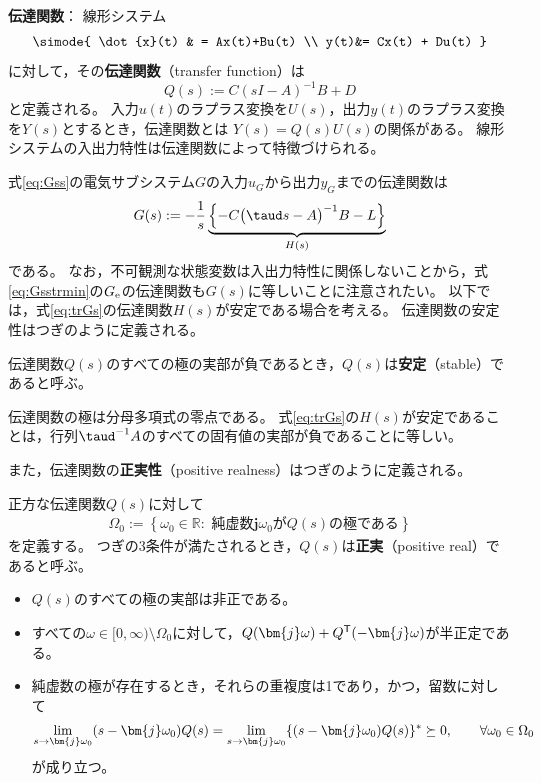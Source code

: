 \documentclass[tombow,dvipdfmx]{corona-a5-1.1}
\begin{document}
\begin{COLUMN}
\noindent \textbf{伝達関数}：
線形システム
\begin{align*}
\simode{
\dot{x}(t) & = Ax(t)+Bu(t) \\
y(t)&= Cx(t) + Du(t)
}
\end{align*}
に対して，その\textbf{伝達関数}（transfer function）は
\[
Q(s):=C(sI-A)^{-1}B +D
\]
と定義される。
入力$u(t)$のラプラス変換を$U(s)$，出力$y(t)$のラプラス変換を$Y(s)$とするとき，伝達関数とは
$Y(s)=Q(s)U(s)$の関係がある。
線形システムの入出力特性は伝達関数によって特徴づけられる。
\end{COLUMN}


式\ref{eq:Gss}の電気サブシステム$G$の入力$u_G$から出力$y_G$までの伝達関数は
\begin{align}\label{eq:trGs}
G(s) :=  - \frac{1}{s} 
\underbrace{
\left\{ -C \bigl( \taud s -A \bigr)^{-1} B - L \right\}
}_{H(s)}
\end{align}
である。
なお，不可観測な状態変数は入出力特性に関係しないことから，式\ref{eq:Gsstrmin}の$G_{\rm e}$の伝達関数も$G(s)$に等しいことに注意されたい。
以下では，式\ref{eq:trGs}の伝達関数$H(s)$が安定である場合を考える。
伝達関数の安定性はつぎのように定義される。

\begin{定義}[伝達関数の安定性]\label{def:trsta}
伝達関数$Q(s)$のすべての極の実部が負であるとき，$Q(s)$は\textbf{安定}（stable）であると呼ぶ。
\end{定義}

伝達関数の極は分母多項式の零点である。
式\ref{eq:trGs}の$H(s)$が安定であることは，行列$\taud^{-1}A$のすべての固有値の実部が負であることに等しい。

また，伝達関数の\textbf{正実性}（positive realness）はつぎのように定義される。

\begin{定義}[伝達関数の正実性]\label{def:trpf}
正方な伝達関数$Q(s)$に対して
\begin{align}\label{eq:defOm0}
\Omega_0 := \left\{
\omega_0 \in \mathbb{R}: 
\mbox{ 純虚数$\bm{j} \omega_0$が$Q(s)$の極である}
\right\}
\end{align}
を定義する。
つぎの3条件が満たされるとき，$Q(s)$は\textbf{正実}（positive real）であると呼ぶ。
\begin{itemize}
\item $Q(s)$のすべての極の実部は非正である。
\item すべての$\omega \in [0,\infty)\setminus \Omega_0$に対して，$Q(\bm{j} \omega) + Q^{\sf T}(-\bm{j} \omega)$が半正定である。
\item 純虚数の極が存在するとき，それらの重複度は1であり，かつ，留数に対して
\begin{align*}
\lim_{s \rightarrow \bm{j} \omega_0} (s-\bm{j} \omega_0) Q(s) = \lim_{s\rightarrow \bm{j} \omega_0} \{ (s-\bm{j} \omega_0) Q(s)\}^{\sf *}\succeq 0
,\qquad
\forall \omega_0 \in \Omega_0
\end{align*}
が成り立つ。
\end{itemize}
\end{定義}
\end{document}

